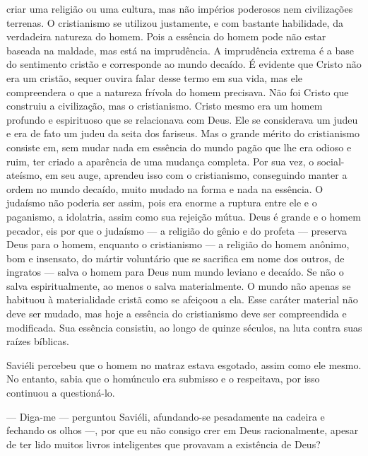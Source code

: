 criar uma religião ou uma cultura, mas não impérios poderosos nem
civilizações terrenas. O cristianismo se utilizou justamente, e com
bastante habilidade, da verdadeira natureza do homem. Pois a essência do
homem pode não estar baseada na maldade, mas está na imprudência. A
imprudência extrema é a base do sentimento cristão e corresponde ao
mundo decaído. É evidente que Cristo não era um cristão, sequer ouvira
falar desse termo em sua vida, mas ele compreendera o que a natureza
frívola do homem precisava. Não foi Cristo que construiu a civilização,
mas o cristianismo. Cristo mesmo era um homem profundo e espirituoso que
se relacionava com Deus. Ele se considerava um judeu e era de fato um
judeu da seita dos fariseus. Mas o grande mérito do cristianismo
consiste em, sem mudar nada em essência do mundo pagão que lhe era
odioso e ruim, ter criado a aparência de uma mudança completa. Por sua
vez, o social-ateísmo, em seu auge, aprendeu isso com o cristianismo,
conseguindo manter a ordem no mundo decaído, muito mudado na forma e
nada na essência. O judaísmo não poderia ser assim, pois era enorme a
ruptura entre ele e o paganismo, a idolatria, assim como sua rejeição
mútua. Deus é grande e o homem pecador, eis por que o judaísmo --- a
religião do gênio e do profeta --- preserva Deus para o homem, enquanto
o cristianismo --- a religião do homem anônimo, bom e insensato, do
mártir voluntário que se sacrifica em nome dos outros, de ingratos ---
salva o homem para Deus num mundo leviano e decaído. Se não o salva
espiritualmente, ao menos o salva materialmente. O mundo não apenas se
habituou à materialidade cristã como se afeiçoou a ela. Esse caráter
material não deve ser mudado, mas hoje a essência do cristianismo deve
ser compreendida e modificada. Sua essência consistiu, ao longo de
quinze séculos, na luta contra suas raízes bíblicas.

Saviéli percebeu que o homem no matraz estava esgotado, assim como ele
mesmo. No entanto, sabia que o homúnculo era submisso e o respeitava,
por isso continuou a questioná-lo.

--- Diga-me --- perguntou Saviéli, afundando-se pesadamente na cadeira e
fechando os olhos ---, por que eu não consigo crer em Deus
racionalmente, apesar de ter lido muitos livros inteligentes que
provavam a existência de Deus?


